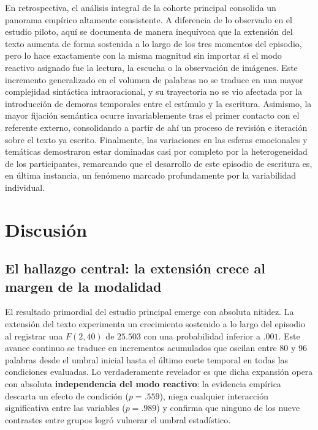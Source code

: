 \documentclass[12pt]{article}
\begin{document}
	En retrospectiva, el análisis integral de la cohorte principal consolida un panorama empírico altamente consistente. A diferencia de lo observado en el estudio piloto, aquí se documenta de manera inequívoca que la extensión del texto aumenta de forma sostenida a lo largo de los tres momentos del episodio, pero lo hace exactamente con la misma magnitud sin importar si el modo reactivo asignado fue la lectura, la escucha o la observación de imágenes. Este incremento generalizado en el volumen de palabras no se traduce en una mayor complejidad sintáctica intraoracional, y su trayectoria no se vio afectada por la introducción de demoras temporales entre el estímulo y la escritura. Asimismo, la mayor fijación semántica ocurre invariablemente tras el primer contacto con el referente externo, consolidando a partir de ahí un proceso de revisión e iteración sobre el texto ya escrito. Finalmente, las variaciones en las esferas emocionales y temáticas demostraron estar dominadas casi por completo por la heterogeneidad de los participantes, remarcando que el desarrollo de este episodio de escritura es, en última instancia, un fenómeno marcado profundamente por la variabilidad individual.


	\section{Discusión}
	
	\subsection{El hallazgo central: la extensión crece al margen de la modalidad}
	
	El resultado primordial del estudio principal emerge con absoluta nitidez. La extensión del texto experimenta un crecimiento sostenido a lo largo del episodio al registrar una $F(2,40)$ de $25.503$ con una probabilidad inferior a $.001$. Este avance continuo se traduce en incrementos acumulados que oscilan entre 80 y 96 palabras desde el umbral inicial hasta el último corte temporal en todas las condiciones evaluadas. Lo verdaderamente revelador es que dicha expansión opera con absoluta \textbf{independencia del modo reactivo}: la evidencia empírica descarta un efecto de condición ($p = .559$), niega cualquier interacción significativa entre las variables ($p = .989$) y confirma que ninguno de los nueve contrastes entre grupos logró vulnerar el umbral estadístico.
	
\end{document}
